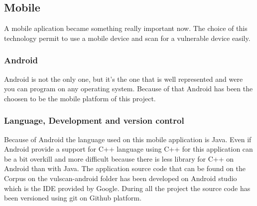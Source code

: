 \documentclass{report}
\begin{document}
\subsection{Mobile}
A mobile aplication became something really important now. The choice of this technology permit to use a mobile device and scan for a vulnerable device easily.

\subsubsection{Android}
Android is not the only one, but it's the one that is well represented and were you can program on any operating system. Because of that Android has been the choosen to be the mobile platform of this project.

\subsubsection{Language, Development and version control}
Because of Android the language used on this mobile application is Java. Even if Android provide a support for C++ language using C++ for this application can be a bit overkill and more difficult because there is less library for C++ on Android than with Java.\newline
The application source code that can be found on the Corpus on the vulscan-android folder has been developed on Android studio which is the IDE provided by Google.\newline
During all the project the source code has been versioned using git on Github platform.
\end{document}

